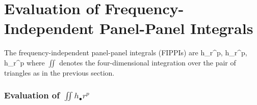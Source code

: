 \documentclass[letterpaper]{article}
\begin{document}
\newpage
\section{Evaluation of Frequency-Independent Panel-Panel Integrals}

The frequency-independent panel-panel integrals (FIPPIs) are
{ \iint h_\bullet r^p,
  \qquad
  \iint h_\nabla r^p,
  \qquad
  \iint h_\times r^p
}
where $\iint$ denotes the four-dimensional integration over
the pair of triangles as in the previous section.


\subsubsection*{Evaluation of $\iint h_\bullet r^p$}
\end{document}
